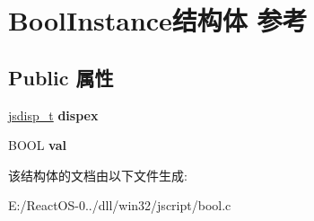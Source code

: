 \hypertarget{struct_bool_instance}{}\section{Bool\+Instance结构体 参考}
\label{struct_bool_instance}
\subsection*{Public 属性}
\begin{DoxyCompactItemize}
\item 
\mbox{\label{struct_bool_instance_a992f5d616b4e6ef0f91c7f3934895590}} 
\hyperlink{structjsdisp__t}{jsdisp\+\_\+t} {\bfseries dispex}
\item 
\mbox{\label{struct_bool_instance_ad28373c72d47695520ba2854fe788a47}} 
B\+O\+OL {\bfseries val}
\end{DoxyCompactItemize}


该结构体的文档由以下文件生成\+:\begin{DoxyCompactItemize}
\item 
E\+:/\+React\+O\+S-\/0../dll/win32/jscript/bool.\+c\end{DoxyCompactItemize}
